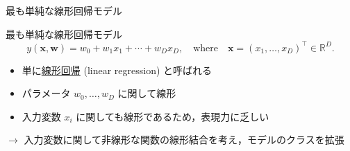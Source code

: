 \documentclass[uplatex,11pt,dvipdfmx,aspectratio=169,unicode,t]{beamer}
\numberwithin{equation}{section}
\newcommand{\BR}{\mathbb{R}}
\newcommand{\bs}[1]{\boldsymbol{#1}}
\newcommand{\1}{\bs{1}}
\newcommand{\0}{\bs{0}}
\begin{document}
\begin{frame}{最も単純な線形回帰モデル}
    \begin{itembox}[c]{最も単純な線形回帰モデル}
        \vspace{-11pt}
        \begin{equation}
            y(\bs{x},\bs{w}) = w_{0} + w_{1}x_{1} + \cdots + w_{D}x_{D}, \quad \text{where} \quad \bs{x} = (x_{1},\ldots,x_{D})^{\top} \in \BR^{D}.
        \end{equation}
    \end{itembox}
    \vspace{-22pt}
    \begin{itemize}
        \item 単に\underline{線形回帰} (linear regression) と呼ばれる
        \item パラメータ $w_{0},\ldots,w_{D}$ に関して線形
        \item 入力変数 $x_{i}$ に関しても線形であるため，表現力に乏しい
    \end{itemize}
    $\longrightarrow$ 入力変数に関して非線形な関数の線形結合を考え，モデルのクラスを拡張
\end{frame}
\end{document}
